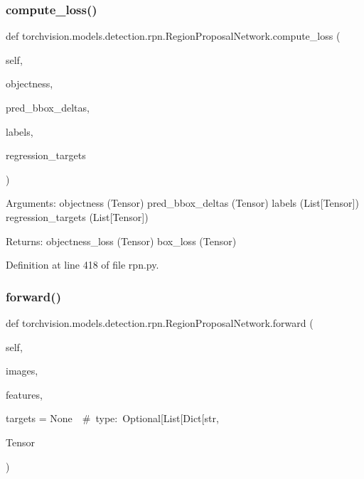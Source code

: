 \subsubsection{\texorpdfstring{compute\+\_\+loss()}{compute\_loss()}}
{\footnotesize\ttfamily def torchvision.\+models.\+detection.\+rpn.\+Region\+Proposal\+Network.\+compute\+\_\+loss (\begin{DoxyParamCaption}\item[{}]{self,  }\item[{}]{objectness,  }\item[{}]{pred\+\_\+bbox\+\_\+deltas,  }\item[{}]{labels,  }\item[{}]{regression\+\_\+targets }\end{DoxyParamCaption})}

\begin{DoxyVerb}Arguments:
    objectness (Tensor)
    pred_bbox_deltas (Tensor)
    labels (List[Tensor])
    regression_targets (List[Tensor])

Returns:
    objectness_loss (Tensor)
    box_loss (Tensor)
\end{DoxyVerb}
 

Definition at line 418 of file rpn.\+py.

\mbox{\label{classtorchvision_1_1models_1_1detection_1_1rpn_1_1RegionProposalNetwork_ae036b9541f9cc96bd617295b401c0cef}} 
\subsubsection{\texorpdfstring{forward()}{forward()}}
{\footnotesize\ttfamily def torchvision.\+models.\+detection.\+rpn.\+Region\+Proposal\+Network.\+forward (\begin{DoxyParamCaption}\item[{}]{self,  }\item[{}]{images,  }\item[{}]{features,  }\item[{}]{targets = {\ttfamily None~~\#~type\+:~Optional\mbox{[}List\mbox{[}Dict\mbox{[}str},  }\item[{}]{Tensor }\end{DoxyParamCaption})}

